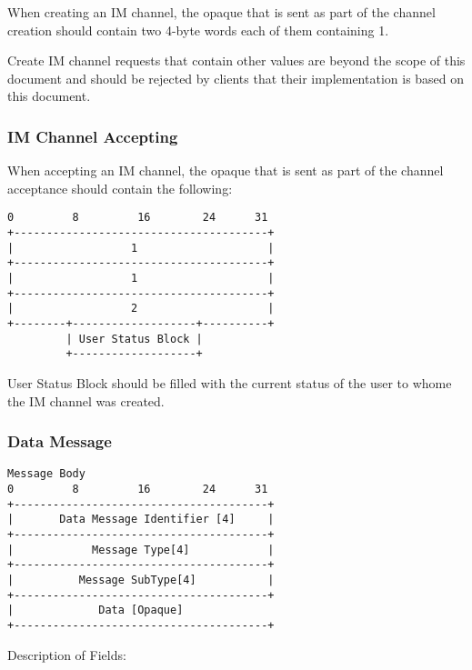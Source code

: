 \documentclass[titlepage,oneside]{book}
\begin{document}
\par{} When creating an IM channel, the opaque that is sent as part of the 
channel creation should contain two 4-byte words each of them 
containing 1.

\par{} Create IM channel requests that contain other values are beyond the
scope of this document and should be rejected by clients that their
implementation is based on this document.

\subsubsection{IM Channel Accepting}

\par{} When accepting an IM channel, the opaque that is sent as part of the
channel acceptance should contain the following:

\begin{verbatim}
0         8         16        24      31
+---------------------------------------+
|                  1                    |
+---------------------------------------+
|                  1                    |
+---------------------------------------+
|                  2                    |
+--------+-------------------+----------+
         | User Status Block |
         +-------------------+
\end{verbatim}

\par{} User Status Block should be filled with the current status of the user
to whome the IM channel was created.

\subsubsection{Data Message}

\begin{verbatim}
Message Body
0         8         16        24      31
+---------------------------------------+
|       Data Message Identifier [4]     |
+---------------------------------------+
|            Message Type[4]            |
+---------------------------------------+
|          Message SubType[4]           |
+---------------------------------------+
|             Data [Opaque]
+---------------------------------------+
\end{verbatim}

\par{} Description of Fields:
\end{document}
